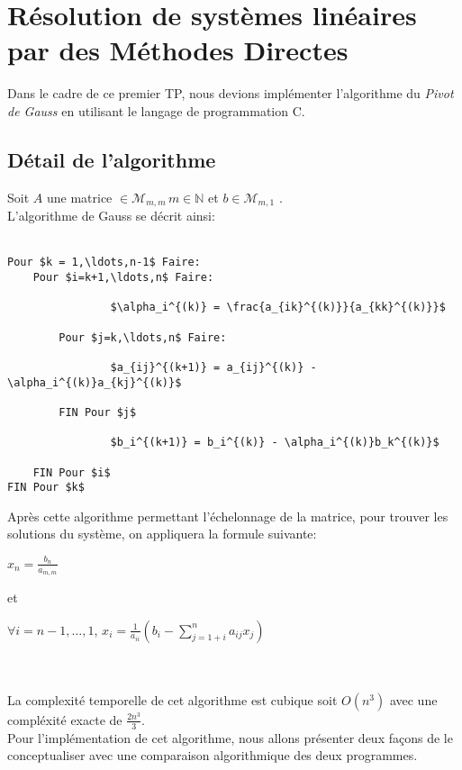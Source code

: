 \documentclass{report}
\begin{document}
\section{Résolution de systèmes linéaires par des Méthodes Directes}
Dans le cadre de ce premier TP, nous devions implémenter l'algorithme du \emph{Pivot de Gauss} en utilisant le langage de programmation C.
\subsection{Détail de l'algorithme}
Soit $A$ une matrice $ \in \mathcal{M}_{m,m}\,m \in \mathbb{N}$ et $b \in \mathcal{M}_{m,1}$ . \\
L'algorithme de Gauss se décrit ainsi: \\ \\
\begin{lstlisting}[mathescape=true]
Pour $k = 1,\ldots,n-1$ Faire:
	Pour $i=k+1,\ldots,n$ Faire:

				$\alpha_i^{(k)} = \frac{a_{ik}^{(k)}}{a_{kk}^{(k)}}$ 
		
		Pour $j=k,\ldots,n$ Faire:

		   		$a_{ij}^{(k+1)} = a_{ij}^{(k)} - \alpha_i^{(k)}a_{kj}^{(k)}$
	
		FIN Pour $j$

				$b_i^{(k+1)} = b_i^{(k)} - \alpha_i^{(k)}b_k^{(k)}$

	FIN Pour $i$
FIN Pour $k$
\end{lstlisting}
Après cette algorithme permettant l'échelonnage de la matrice, pour trouver les solutions du système, on appliquera la formule suivante: \\
\begin{Large}
$ x_n = \frac{b_n}{a_{m,m}}$ \\
\end{Large}
\Large{et} \\ 
\begin{Large}
$ \forall i = n-1, \ldots, 1$, $x_i = \frac{1}{a_{ii}}\left( b_i-\sum\limits_{j=1+i}^n a_{ij}x_j \right)$
\end{Large} \\ \\
\normalsize
La complexité temporelle de cet algorithme est cubique soit $O(n^3)$ avec une compléxité exacte de $\frac{2n^3}{3}$. \\
Pour l'implémentation de cet algorithme, nous allons présenter deux façons de le conceptualiser avec une comparaison algorithmique des deux programmes. \\
\end{document}
